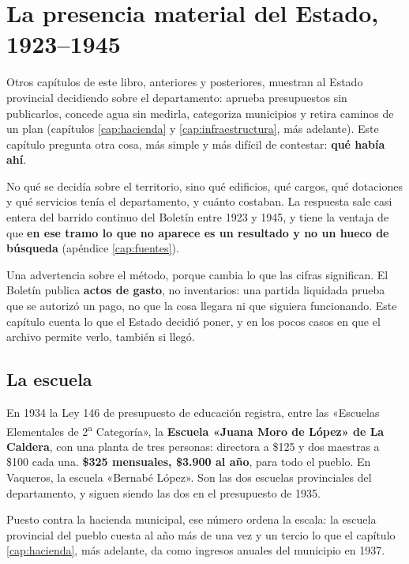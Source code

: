 \chapter{La presencia material del Estado, 1923--1945}
\label{cap:presencia}

Otros capítulos de este libro, anteriores y posteriores, muestran al Estado provincial decidiendo
sobre el departamento: aprueba presupuestos sin publicarlos, concede agua sin medirla,
categoriza municipios y retira caminos de un plan (capítulos \ref{cap:hacienda} y
\ref{cap:infraestructura}, más adelante). Este capítulo pregunta otra cosa, más simple y más difícil de contestar:
\textbf{qué había ahí}.

No qué se decidía sobre el territorio, sino qué edificios, qué cargos, qué dotaciones y qué
servicios tenía el departamento, y cuánto costaban. La respuesta sale casi entera del barrido
continuo del Boletín entre 1923 y 1945, y tiene la ventaja de que \textbf{en ese tramo lo que no
aparece es un resultado y no un hueco de búsqueda} (apéndice \ref{cap:fuentes}).

\begin{cautela}
Una advertencia sobre el método, porque cambia lo que las cifras significan. El Boletín publica
\textbf{actos de gasto}, no inventarios: una partida liquidada prueba que se autorizó un pago,
no que la cosa llegara ni que siguiera funcionando. Este capítulo cuenta lo que el Estado
decidió poner, y en los pocos casos en que el archivo permite verlo, también si llegó.
\end{cautela}

\section{La escuela}

En 1934 la Ley 146 de presupuesto de educación registra, entre las «Escuelas Elementales de 2\textsuperscript{a}
Categoría», la \textbf{Escuela «Juana Moro de López» de La Caldera}, con una planta de tres
personas: directora a \$125 y dos maestras a \$100 cada una. \textbf{\$325 mensuales, \$3.900 al
año}, para todo el pueblo. En Vaqueros, la escuela «Bernabé López». Son las dos escuelas
provinciales del departamento, y siguen siendo las dos en el presupuesto de 1935.

Puesto contra la hacienda municipal, ese número ordena la escala: la escuela provincial del
pueblo cuesta al año más de una vez y un tercio lo que el capítulo \ref{cap:hacienda}, más adelante, da como ingresos
anuales del municipio en 1937.

